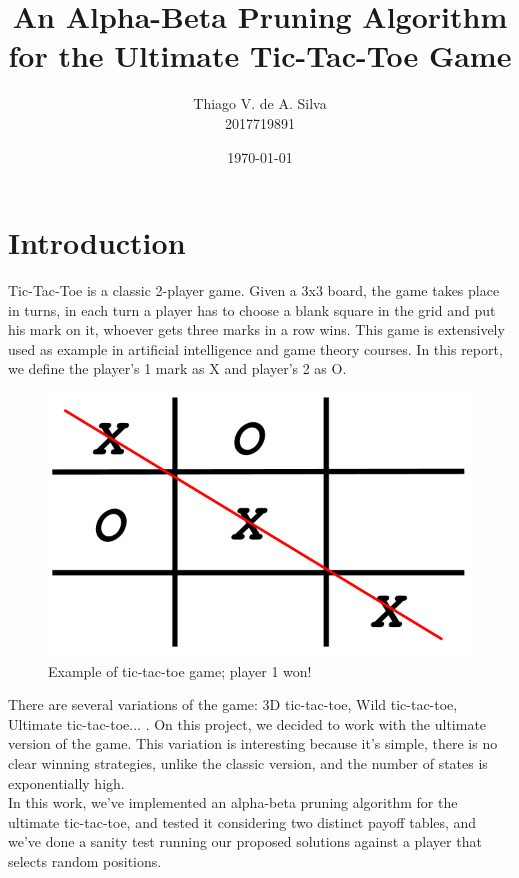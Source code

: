 \documentclass[10pt]{article}
\title{\textbf{An Alpha-Beta Pruning Algorithm for the Ultimate Tic-Tac-Toe Game}}
\author{Thiago V. de A. Silva\\2017719891}
\date{\today}
\begin{document}
\maketitle

\section{Introduction}

Tic-Tac-Toe is a classic 2-player game. Given a 3x3 board, the game takes place in turns, in each turn a player has to choose a blank square in the grid and put his mark on it, whoever gets three marks in a row wins. This game is extensively used as example in artificial intelligence and game theory courses. In this report, we define the player's 1 mark as X and player's 2 as O.

\begin{figure}[h]
\centering
\includegraphics[scale=0.2]{img/tic-tac-toe.png}
\caption{Example of tic-tac-toe game; player 1 won!}
\end{figure}

 There are several variations of the game: 3D tic-tac-toe, Wild tic-tac-toe, Ultimate tic-tac-toe... \cite{3dtictactoe,wildtictactoe,ultimatetictactoe}. On this project, we decided to work with the ultimate version of the game. This variation is interesting because it's simple, there is no clear winning strategies, unlike the classic version, and the number of states is exponentially high.\\
 
In this work, we've implemented an alpha-beta pruning algorithm for the ultimate tic-tac-toe, and tested it considering two distinct payoff tables, and we've done a sanity test running our proposed solutions against a player that selects random positions.
\end{document}
